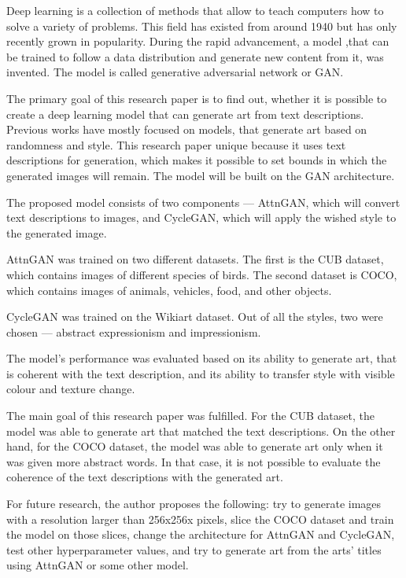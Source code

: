 \documentclass{vilgym}
\begin{document}
	
	Deep learning is a collection of methods that allow to teach computers how to solve a variety of problems. This field has existed from around 1940 but has only recently grown in popularity. During the rapid advancement, a model ,that can be trained to follow a data distribution and generate new content from it, was invented. The model is called generative adversarial network or GAN.
	
	The primary goal of this research paper is to find out, whether it is possible to create a deep learning model that can generate art from text descriptions. Previous works have mostly focused on models, that generate art based on randomness and style. This research paper unique because it uses text descriptions for generation, which makes it possible to set bounds in which the generated images will remain. The model will be built on the GAN architecture.
	
	The proposed model consists of two components --- AttnGAN, which will convert text descriptions to images, and CycleGAN, which will apply the wished style to the generated image.
	
	AttnGAN was trained on two different datasets. The first is the CUB dataset, which contains images of different species of birds. The second dataset is COCO, which contains images of animals, vehicles, food, and other objects.
	
	CycleGAN was trained on the Wikiart dataset. Out of all the styles, two were chosen --- abstract expressionism and impressionism.
	
	The model's performance was evaluated based on its ability to generate art, that is coherent with the text description, and its ability to transfer style with visible colour and texture change.
	
	The main goal of this research paper was fulfilled. For the CUB dataset, the model was able to generate art that matched the text descriptions. On the other hand, for the COCO dataset, the model was able to generate art only when it was given more abstract words. In that case, it is not possible to evaluate the coherence of the text descriptions with the generated art.
	
	For future research, the author proposes the following: try to generate images with a resolution larger than 256x256x pixels, slice the COCO dataset and train the model on those slices, change the architecture for AttnGAN and CycleGAN, test other hyperparameter values, and try to generate art from the arts' titles using AttnGAN or some other model.
\end{document}
